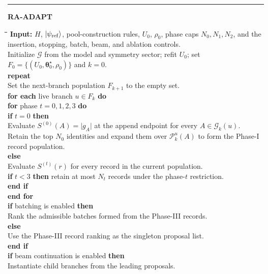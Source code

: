 \documentclass[
  reprint,
  amsmath,
  amssymb,
  aps,
  pra,
  nofootinbib,
  superscriptaddress,
  floatfix
]{revtex4-2}
\newcommand{\ket}[1]{|#1\rangle}
\begin{document}
\begin{widetext}
\footnotesize
\noindent\rule{\textwidth}{0.4pt}
\textbf{RA-ADAPT}
\begin{tabbing}
\hspace{1.5em}\=\hspace{1.5em}\=\hspace{1.5em}\=\hspace{1.5em}\=\kill
\textbf{Input:} \(H\), \(\ket{\psi_{\rm ref}}\), pool-construction rules, \(U_0\), \(\rho_0\), phase caps \(N_0,N_1,N_2\), and the insertion, stopping, batch, beam, and ablation controls.\\
Initialize \(\mathcal G\) from the model and symmetry sector; refit \(U_0\); set \(F_0=\{(U_0,\boldsymbol\theta_0^\star,\rho_0)\}\) and \(k=0\).\\
\textbf{repeat}\\
\>Set the next-branch population \(F_{k+1}\) to the empty set.\\
\>\textbf{for each} live branch \(u\in F_k\) \textbf{do}\\
\>\>\textbf{for} phase \(t=0,1,2,3\) \textbf{do}\\
\>\>\>\textbf{if} \(t=0\) \textbf{then}\\
\>\>\>\>Evaluate \(S^{(0)}(A)=\lvert g_A\rvert\) at the append endpoint for every \(A\in\mathcal G_k(u)\).\\
\>\>\>\>Retain the top \(N_0\) identities and expand them over \(\mathcal P_k^u(A)\) to form the Phase-I record population.\\
\>\>\>\textbf{else}\\
\>\>\>\>Evaluate \(S^{(t)}(r)\) for every record in the current population.\\
\>\>\>\>\textbf{if} \(t<3\) \textbf{then} retain at most \(N_t\) records under the phase-\(t\) restriction.\\
\>\>\>\textbf{end if}\\
\>\>\textbf{end for}\\
\>\>\textbf{if} batching is enabled \textbf{then}\\
\>\>\>Rank the admissible batches formed from the Phase-III records.\\
\>\>\textbf{else}\\
\>\>\>Use the Phase-III record ranking as the singleton proposal list.\\
\>\>\textbf{end if}\\
\>\>\textbf{if} beam continuation is enabled \textbf{then}\\
\>\>\>Instantiate child branches from the leading proposals.\\

\end{tabbing}
\end{widetext}
\end{document}
